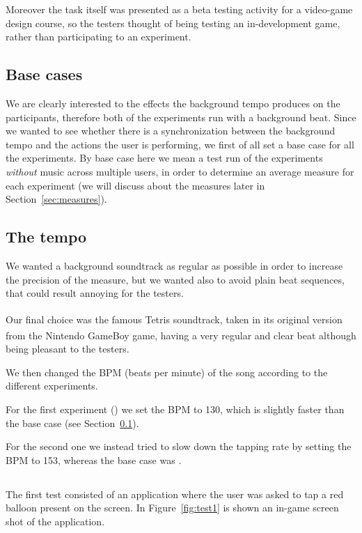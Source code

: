 Moreover the task itself was presented as a beta testing activity for a video-game design course, so the testers thought of being testing an in-development game, rather than participating to an experiment.

\subsection{Base cases}
\label{sec:base-cases}
We are clearly interested to the effects the background tempo produces on the participants, therefore both of the experiments run with a background beat.
Since we wanted to see whether there is a synchronization between the background tempo and the actions the user is performing, we first of all set a base case for all the experiments.
By base case here we mean a test run of the experiments \emph{without} music across multiple users, in order to determine an average measure for each experiment (we will discuss about the measures later in Section~\ref{sec:measures}).

\subsection{The tempo}
We wanted a background soundtrack as regular as possible in order to increase the precision of the measure, but we wanted also to avoid plain beat sequences, that could result annoying for the testers.

Our final choice was the famous Tetris\textsuperscript{\texttrademark} soundtrack, taken in its original version from the Nintendo\textsuperscript{\texttrademark} GameBoy\textsuperscript{\texttrademark} game, having a very regular and clear beat although being pleasant to the testers.

We then changed the BPM (beats per minute) of the song according to the different experiments.

For the first experiment () we set the BPM to 130, which is slightly faster than the base case (see Section~\ref{sec:base-cases}).

For the second one we instead tried to slow down the tapping rate by setting the BPM to 153, whereas the base case was .

\subsection{\testfirst}
\label{sec:test1}
The first test consisted of an application where the user was asked to tap a red balloon present on the screen. In Figure~\ref{fig:test1} is shown an in-game screen shot of the application.

